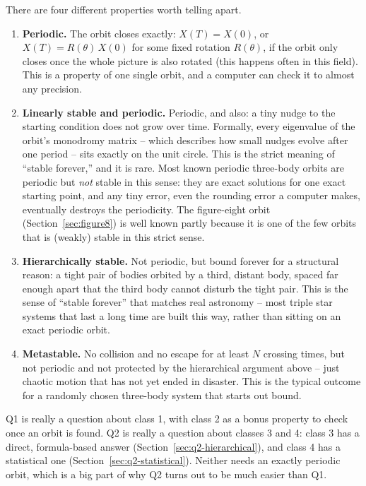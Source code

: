 \documentclass[11pt]{article}
\begin{document}
There are four different properties worth telling apart.

\begin{enumerate}
  \item \textbf{Periodic.} The orbit closes exactly:
    $X(T) = X(0)$, or $X(T) = R(\theta)\,X(0)$ for some fixed rotation
    $R(\theta)$, if the orbit only closes once the whole picture is also
    rotated (this happens often in this field). This is a property of one
    single orbit, and a computer can check it to almost any precision.
  \item \textbf{Linearly stable and periodic.} Periodic, and also: a tiny
    nudge to the starting condition does not grow over time. Formally,
    every eigenvalue of the orbit's monodromy matrix -- which describes how
    small nudges evolve after one period -- sits exactly on the unit
    circle. This is the strict meaning of ``stable forever,'' and it is
    rare. Most known periodic three-body orbits are periodic but
    \emph{not} stable in this sense: they are exact solutions for one
    exact starting point, and any tiny error, even the rounding error a
    computer makes, eventually destroys the periodicity. The figure-eight
    orbit (Section~\ref{sec:figure8}) is well known partly because it is
    one of the few orbits that is (weakly) stable in this strict sense.
  \item \textbf{Hierarchically stable.} Not periodic, but bound forever
    for a structural reason: a tight pair of bodies orbited by a third,
    distant body, spaced far enough apart that the third body cannot
    disturb the tight pair. This is the sense of ``stable forever'' that
    matches real astronomy -- most triple star systems that last a long
    time are built this way, rather than sitting on an exact periodic
    orbit.
  \item \textbf{Metastable.} No collision and no escape for at least $N$
    crossing times, but not periodic and not protected by the hierarchical
    argument above -- just chaotic motion that has not yet ended in
    disaster. This is the typical outcome for a randomly chosen three-body
    system that starts out bound.
\end{enumerate}

Q1 is really a question about class 1, with class 2 as a bonus property to
check once an orbit is found. Q2 is really a question about classes 3 and
4: class 3 has a direct, formula-based answer
(Section~\ref{sec:q2-hierarchical}), and class 4 has a statistical one
(Section~\ref{sec:q2-statistical}). Neither needs an exactly periodic
orbit, which is a big part of why Q2 turns out to be much easier than Q1.
\end{document}
